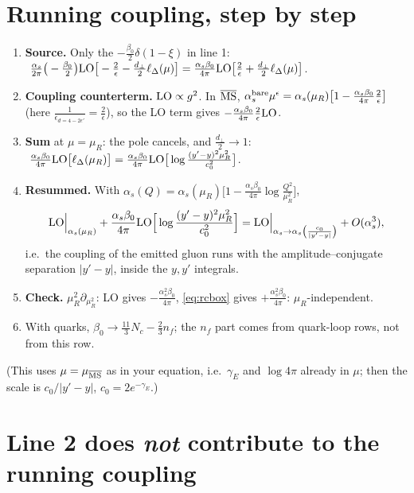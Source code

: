 \documentclass[10pt]{article}
\numberwithin{equation}{section}
\newcommand{\LO}{{\rm LO}}
\newcommand{\MSb}{\overline{\rm MS}}
\begin{document}
\section{Running coupling, step by step}\label{sec:rc}
\begin{enumerate}
\item \textbf{Source.} Only the $-\frac{\beta_0}{2}\delta(1-\xi)$ in line 1:
$\ \frac{\alpha_s}{2\pi}\big(-\frac{\beta_0}{2}\big)\LO\big[-\frac2\epsilon-\frac{d_\perp}{2}\ell_\Delta(\mu)\big]=\frac{\alpha_s\beta_0}{4\pi}\LO\big[\frac2\epsilon+\frac{d_\perp}2\ell_\Delta(\mu)\big]$.
\item \textbf{Coupling counterterm.} $\LO\propto g^2$. In $\MSb$, $\alpha_s^{\rm bare}\mu^{\epsilon}=\alpha_s(\mu_R)\big[1-\frac{\alpha_s\beta_0}{4\pi}\frac2\epsilon\big]$ (here $\frac1{\epsilon_{d=4-2\epsilon'}}=\frac2\epsilon$), so the LO term gives $-\frac{\alpha_s\beta_0}{4\pi}\frac2\epsilon\LO$.
\item \textbf{Sum} at $\mu=\mu_R$: the pole cancels, and $\frac{d_\perp}2\to1$:
$\ \frac{\alpha_s\beta_0}{4\pi}\LO\big[\ell_\Delta(\mu_R)\big]=\frac{\alpha_s\beta_0}{4\pi}\LO\big[\log\frac{(y'-y)^2\mu_R^2}{c_0^2}\big]$.
\item \textbf{Resummed.} With $\alpha_s(Q)=\alpha_s(\mu_R)\big[1-\frac{\alpha_s\beta_0}{4\pi}\log\frac{Q^2}{\mu_R^2}\big]$,
\begin{equation}
\LO\Big|_{\alpha_s(\mu_R)}+\frac{\alpha_s\beta_0}{4\pi}\LO\Big[\log\frac{(y'-y)^2\mu_R^2}{c_0^2}\Big]=\LO\Big|_{\alpha_s\to\alpha_s\left(\frac{c_0}{|y'-y|}\right)}+O(\alpha_s^3),\label{eq:rcres}
\end{equation}
i.e.\ the coupling of the emitted gluon runs with the amplitude--conjugate separation $|y'-y|$, inside the $y,y'$ integrals.
\item \textbf{Check.} $\mu_R^2\partial_{\mu_R^2}$: LO gives $-\frac{\alpha_s^2\beta_0}{4\pi}$, \eqref{eq:rcbox} gives $+\frac{\alpha_s^2\beta_0}{4\pi}$: $\mu_R$-independent.
\item With quarks, $\beta_0\to\frac{11}3N_c-\frac23n_f$; the $n_f$ part comes from quark-loop rows, not from this row.
\end{enumerate}
\noindent (This uses $\mu=\mu_{\MSb}$ as in your equation, i.e.\ $\gamma_E$ and $\log4\pi$ already in $\mu$; then the scale is $c_0/|y'-y|$, $c_0=2e^{-\gamma_E}$.)

\section{Line 2 does \emph{not} contribute to the running coupling}\label{sec:line2}
\end{document}
